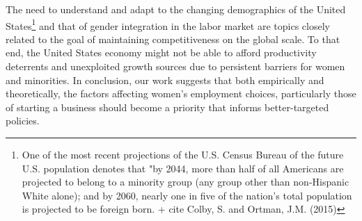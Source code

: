 The need to understand and adapt to the changing demographics of the United States\footnote{One of the most recent projections of the U.S. Census Bureau of the future U.S. population denotes that "by 2044, more than half of all Americans are projected to belong to a minority group (any group other than non-Hispanic White alone); and by 2060, nearly one in five of the nation’s total population is projected to be foreign born. + cite Colby, S. and Ortman, J.M. (2015)} and that of gender integration in the labor market are topics closely related to the goal of maintaining competitiveness on the global scale. To that end, the United States economy might not be able to afford productivity deterrents and unexploited growth sources due to persistent barriers for women and minorities. In conclusion, our work suggests that both empirically and theoretically, the factors affecting women’s employment choices, particularly those of starting a business should become a priority that informs better-targeted policies. 